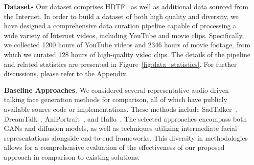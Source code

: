 \noindent\textbf{Datasets} Our dataset comprises HDTF~\cite{zhang2021flow} as well as additional data sourced from the Internet. In order to build a dataset of both high quality and diversity, we have designed a comprehensive data curation pipeline capable of processing a wide variety of Internet videos, including YouTube and movie clips. Specifically, we collected 1200 hours of YouTube videos and 2346 hours of movie footage, from which we curated 128 hours of high-quality video clips. The details of the pipeline and related statistics are presented in Figure~\ref{fig:data_statistics}. For further discussions, please refer to the Appendix.

\noindent\textbf{Baseline Approaches.}
We considered several representative audio-driven talking face generation methods for comparison, all of which have publicly available source code or implementations. These methods include SadTalker~\cite{zhang2022sadtalker}, DreamTalk~\cite{ma2023dreamtalk}, AniPortrait~\cite{wei2024aniportrait}, and Hallo~\cite{xu2024hallo,cui2024hallo2}. 
The selected approaches encompass both GANs and diffusion models, as well as techniques utilizing intermediate facial representations alongside end-to-end frameworks. 
This diversity in methodologies allows for a comprehensive evaluation of the effectiveness of our proposed approach in comparison to existing solutions.

